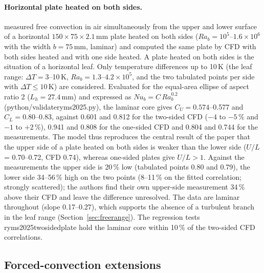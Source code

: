 \documentclass[11pt,a4paper]{article}
\newcommand{\Nu}{\mathit{Nu}}
\newcommand{\Ra}{\mathit{Ra}}
\newcommand{\codeus}{\char95\allowbreak}
\DeclareRobustCommand{\code}[1]{\textnormal{\ttfamily\let\_\codeus #1}}
\begin{document}
\paragraph{Horizontal plate heated on both sides.} \citet{ryms2025} measured free convection in air simultaneously from the upper and lower surface of a horizontal $150\times75\times2.1$\,mm plate heated on both sides ($\Ra_b = 10^5$--$1.6\times10^{6}$ with the width $b = 75$\,mm, laminar) and computed the same plate by CFD with both sides heated and with one side heated. A plate heated on both sides is the situation of a horizontal leaf. Only temperature differences up to 10\,K (the leaf range: $\Delta T = 3$--10\,K, $\Ra_b = 1.3$--$4.2\times10^{5}$, and the two tabulated points per side with $\Delta T\le10$\,K) are considered. Evaluated for the equal-area ellipse of aspect ratio 2 ($L_h = 27.4$\,mm) and expressed as $\Nu_b = C\,\Ra_b^{0.2}$ (\code{python/validate\_ryms2025.py}), the laminar core gives $C_U = 0.574$--0.577 and $C_L = 0.80$--0.83, against 0.601 and 0.812 for the two-sided CFD ($-4$ to $-5\,\%$ and $-1$ to $+2\,\%$), 0.941 and 0.808 for the one-sided CFD and 0.804 and 0.744 for the measurements. The model thus reproduces the central result of the paper that the upper side of a plate heated on both sides is weaker than the lower side ($U/L$ = 0.70--0.72, CFD 0.74), whereas one-sided plates give $U/L > 1$. Against the measurements the upper side is 20\,\% low (tabulated points 0.80 and 0.79), the lower side 34--56\,\% high on the two points (8--11\,\% on the fitted correlation; strongly scattered); the authors find their own upper-side measurement 34\,\% above their CFD and leave the difference unresolved. The data are laminar throughout (slope 0.17--0.27), which supports the absence of a turbulent branch in the leaf range (Section~\ref{sec:freerange}). The regression tests \code{ryms2025\_two\_sided\_plate} hold the laminar core within 10\,\% of the two-sided CFD correlations.

\subsection{Forced-convection extensions}
\end{document}
